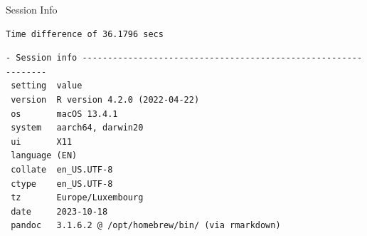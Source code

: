 \documentclass[
  ignorenonframetext,
  aspectratio=169,
]{beamer}
\begin{document}
\begin{frame}[fragile]{Session Info}
\protect\hypertarget{session-info}{}
\linespread{0.5}

\begin{verbatim}
Time difference of 36.1796 secs
\end{verbatim}

\linespread{2}

\linespread{0.5}

\begin{verbatim}
- Session info ---------------------------------------------------------------
 setting  value
 version  R version 4.2.0 (2022-04-22)
 os       macOS 13.4.1
 system   aarch64, darwin20
 ui       X11
 language (EN)
 collate  en_US.UTF-8
 ctype    en_US.UTF-8
 tz       Europe/Luxembourg
 date     2023-10-18
 pandoc   3.1.6.2 @ /opt/homebrew/bin/ (via rmarkdown)


\end{verbatim}
\end{frame}
\end{document}
